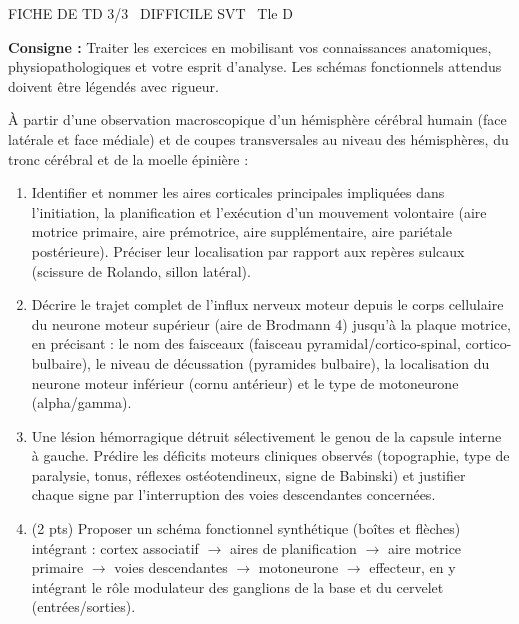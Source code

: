 \documentclass[11pt]{article}
\begin{document}
\begin{tcolorbox}[enhanced,colback=popink,colframe=popink,arc=10pt,boxrule=0pt,left=12pt,right=12pt,top=9pt,bottom=9pt]
{\color{white}\popxbold\small FICHE DE TD 3/3 \textbullet\ DIFFICILE \hfill SVT \textbullet\ Tle D\par}
\end{tcolorbox}
\vspace{4pt}
\noindent \textbf{Consigne :} Traiter les exercices en mobilisant vos connaissances anatomiques, physiopathologiques et votre esprit d'analyse. Les schémas fonctionnels attendus doivent être légendés avec rigueur.

\begin{exercice}
À partir d'une observation macroscopique d'un hémisphère cérébral humain (face latérale et face médiale) et de coupes transversales au niveau des hémisphères, du tronc cérébral et de la moelle épinière :
\begin{enumerate}
    \item Identifier et nommer les aires corticales principales impliquées dans l'initiation, la planification et l'exécution d'un mouvement volontaire (aire motrice primaire, aire prémotrice, aire supplémentaire, aire pariétale postérieure). Préciser leur localisation par rapport aux repères sulcaux (scissure de Rolando, sillon latéral).
    \item Décrire le trajet complet de l'influx nerveux moteur depuis le corps cellulaire du neurone moteur supérieur (aire de Brodmann 4) jusqu'à la plaque motrice, en précisant : le nom des faisceaux (faisceau pyramidal/cortico-spinal, cortico-bulbaire), le niveau de décussation (pyramides bulbaire), la localisation du neurone moteur inférieur (cornu antérieur) et le type de motoneurone (alpha/gamma).
    \item Une lésion hémorragique détruit sélectivement le genou de la capsule interne à gauche. Prédire les déficits moteurs cliniques observés (topographie, type de paralysie, tonus, réflexes ostéotendineux, signe de Babinski) et justifier chaque signe par l'interruption des voies descendantes concernées.
    \item (2 pts) Proposer un schéma fonctionnel synthétique (boîtes et flèches) intégrant : cortex associatif $\rightarrow$ aires de planification $\rightarrow$ aire motrice primaire $\rightarrow$ voies descendantes $\rightarrow$ motoneurone $\rightarrow$ effecteur, en y intégrant le rôle modulateur des ganglions de la base et du cervelet (entrées/sorties).
\end{enumerate}
\end{exercice}
\end{document}
